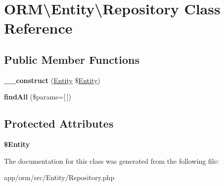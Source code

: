 \hypertarget{classORM_1_1Entity_1_1Repository}{}\section{O\+RM\textbackslash{}Entity\textbackslash{}Repository Class Reference}
\label{classORM_1_1Entity_1_1Repository}
\subsection*{Public Member Functions}
\begin{DoxyCompactItemize}
\item 
{\bfseries \+\_\+\+\_\+construct} (\hyperlink{classORM_1_1Entity_1_1Entity}{Entity} \$\hyperlink{classORM_1_1Entity_1_1Entity}{Entity})\hypertarget{classORM_1_1Entity_1_1Repository_a3e472496199770de24159c9309894d2b}{}\label{classORM_1_1Entity_1_1Repository_a3e472496199770de24159c9309894d2b}

\item 
{\bfseries find\+All} (\$params=\mbox{[}$\,$\mbox{]})\hypertarget{classORM_1_1Entity_1_1Repository_aeabca11d0cfa0b1fa69056dc2d614915}{}\label{classORM_1_1Entity_1_1Repository_aeabca11d0cfa0b1fa69056dc2d614915}

\end{DoxyCompactItemize}
\subsection*{Protected Attributes}
\begin{DoxyCompactItemize}
\item 
{\bfseries \$\+Entity}\hypertarget{classORM_1_1Entity_1_1Repository_a3b30ae1a5be87911bc7f7bafa8f37af5}{}\label{classORM_1_1Entity_1_1Repository_a3b30ae1a5be87911bc7f7bafa8f37af5}

\end{DoxyCompactItemize}


The documentation for this class was generated from the following file\+:\begin{DoxyCompactItemize}
\item 
app/orm/src/\+Entity/Repository.\+php\end{DoxyCompactItemize}
